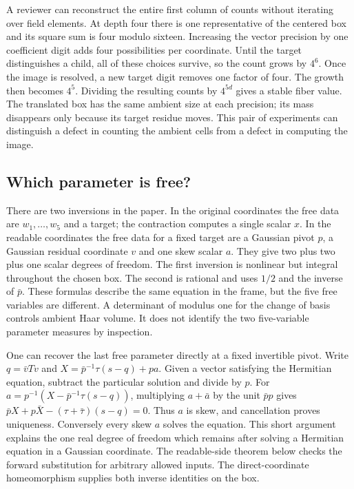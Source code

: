 \documentclass[12pt,letterpaper]{article}
\begin{document}
A reviewer can reconstruct the entire first column of counts without iterating over field elements. At depth four there is one representative of the centered box and its square sum is four modulo sixteen. Increasing the vector precision by one coefficient digit adds four possibilities per coordinate. Until the target distinguishes a child, all of these choices survive, so the count grows by $4^6$. Once the image is resolved, a new target digit removes one factor of four. The growth then becomes $4^5$. Dividing the resulting counts by $4^{5d}$ gives a stable fiber value. The translated box has the same ambient size at each precision; its mass disappears only because its target residue moves. This pair of experiments can distinguish a defect in counting the ambient cells from a defect in computing the image.

\subsection{Which parameter is free?}
There are two inversions in the paper. In the original coordinates the free data are $w_1,\dots,w_5$ and a target; the contraction computes a single scalar $x$. In the readable coordinates the free data for a fixed target are a Gaussian pivot $p$, a Gaussian residual coordinate $v$ and one skew scalar $a$. They give two plus two plus one scalar degrees of freedom. The first inversion is nonlinear but integral throughout the chosen box. The second is rational and uses $1/2$ and the inverse of $\bar p$. These formulas describe the same equation in the frame, but the five free variables are different. A determinant of modulus one for the change of basis controls ambient Haar volume. It does not identify the two five-variable parameter measures by inspection.

One can recover the last free parameter directly at a fixed invertible pivot. Write $q=\bar v T v$ and $X=\bar p^{-1}\tau(s-q)+pa$. Given a vector satisfying the Hermitian equation, subtract the particular solution and divide by $p$. For $a=p^{-1}(X-\bar p^{-1}\tau(s-q))$, multiplying $a+\bar a$ by the unit $\bar p p$ gives $\bar p X+p\bar X-(\tau+\bar\tau)(s-q)=0$. Thus $a$ is skew, and cancellation proves uniqueness. Conversely every skew $a$ solves the equation. This short argument explains the one real degree of freedom which remains after solving a Hermitian equation in a Gaussian coordinate. The readable-side theorem below checks the forward substitution for arbitrary allowed inputs. The direct-coordinate homeomorphism supplies both inverse identities on the box.
\end{document}
